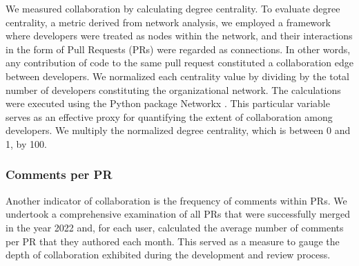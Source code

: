 \documentclass[manuscript,screen,review]{acmart}
\begin{document}
We measured collaboration by calculating degree centrality. To evaluate
degree centrality, a metric derived from network analysis, we employed a
framework where developers were treated as nodes within the network, and
their interactions in the form of Pull Requests (PRs) were regarded as
connections. In other words, any contribution of code to the same pull
request constituted a collaboration edge between developers. We
normalized each centrality value by dividing by the total number of
developers constituting the organizational network. The calculations
were executed using the Python package Networkx
\citep{SciPyProceedings_11}. This particular variable serves as an
effective proxy for quantifying the extent of collaboration among
developers. We multiply the normalized degree centrality, which is
between 0 and 1, by 100.

\subsubsection{Comments per PR}\label{comments-per-pr}

Another indicator of collaboration is the frequency of comments within
PRs. We undertook a comprehensive examination of all PRs that were
successfully merged in the year 2022 and, for each user, calculated the
average number of comments per PR that they authored each month. This
served as a measure to gauge the depth of collaboration exhibited during
the development and review process.
\end{document}
